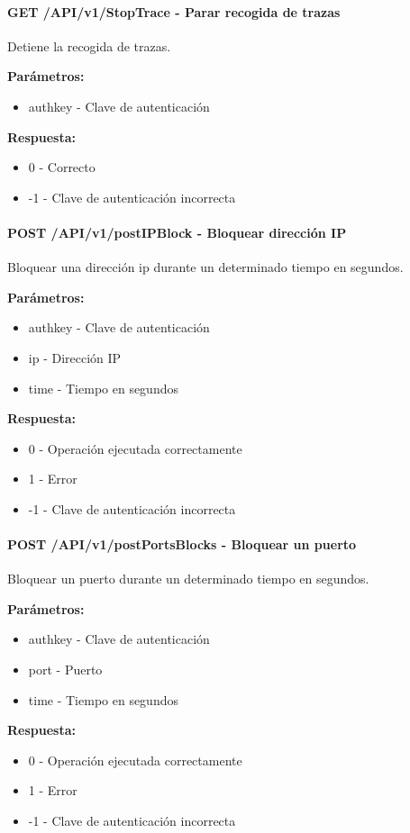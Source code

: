 \paragraph{\textbf{GET}  /API/v1/StopTrace - Parar recogida de trazas}
Detiene la recogida de trazas.

\textbf{Parámetros:}

\begin{itemize}
\item authkey - Clave de autenticación
\end{itemize}
\textbf{Respuesta:}
\begin{itemize}
\item 0 - Correcto
\item -1 - Clave de autenticación incorrecta
\end{itemize}
\paragraph{\textbf{POST}  /API/v1/postIPBlock - Bloquear dirección IP}
Bloquear una dirección ip durante un determinado tiempo en segundos.

\textbf{Parámetros:}

\begin{itemize}
\item authkey - Clave de autenticación
\item ip - Dirección IP
\item time - Tiempo en segundos
\end{itemize}
\textbf{Respuesta:}
\begin{itemize}
\item 0 - Operación ejecutada correctamente
\item 1 - Error
\item -1 - Clave de autenticación incorrecta
\end{itemize}
\paragraph{\textbf{POST} /API/v1/postPortsBlocks - Bloquear un puerto}
Bloquear un puerto durante un determinado tiempo en segundos.

\textbf{Parámetros:}

\begin{itemize}
\item authkey - Clave de autenticación
\item port - Puerto
\item time - Tiempo en segundos
\end{itemize}
\textbf{Respuesta:}
\begin{itemize}
\item 0 - Operación ejecutada correctamente
\item 1 - Error
\item -1 - Clave de autenticación incorrecta
\end{itemize}
